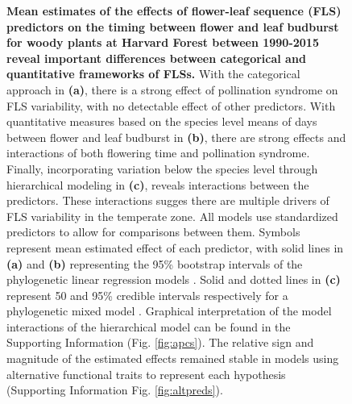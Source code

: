 \documentclass[11pt]{article}
\begin{document}
\pagebreak  

 \begin{figure}[h!]
        \centering
          \caption{\textbf{Mean estimates of the effects of flower-leaf sequence (FLS) predictors on the timing between flower and leaf budburst for woody plants at Harvard Forest between 1990-2015 reveal important differences between categorical and quantitative frameworks of FLSs.}  With the categorical approach in \textbf{(a)}, there is a strong effect of  pollination syndrome on FLS variability, with no detectable effect of other predictors. With quantitative measures based on the species level means of days between flower and leaf budburst in \textbf{(b)}, there are strong effects and interactions of both flowering time and pollination syndrome. Finally, incorporating variation below the species level through hierarchical modeling in \textbf{(c)}, reveals interactions between the predictors. These interactions sugges there are multiple drivers of FLS variability in the temperate zone. All models use standardized predictors to allow for comparisons between them. Symbols represent mean estimated effect of each predictor, with solid lines in \textbf{(a)} and \textbf{(b)} representing the 95\% bootstrap intervals of the phylogenetic linear regression models \citep{Ives2010}. Solid and dotted lines in \textbf{(c)} represent 50 and 95\% credible intervals respectively for a phylogenetic mixed model \citep{Garamszegi2014}. Graphical interpretation of the model interactions of the hierarchical model can be found in the Supporting Information (Fig. \ref{fig:apcs}). The relative sign and magnitude of the estimated effects remained stable in models using alternative functional traits to represent each hypothesis (Supporting Information Fig. \ref{fig:altpreds}).}  
        \label{fig:muplotsHF}
    \end{figure}    


    
\end{document}
